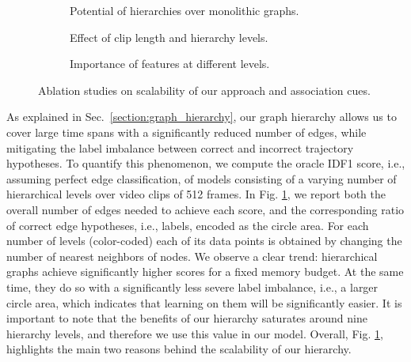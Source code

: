 \documentclass[10pt,twocolumn,letterpaper]{article}
\begin{document}
{{\begin{figure*}
     \centering
     \begin{subfigure}[b]{0.33\textwidth}
         \centering
         \caption{Potential of hierarchies over monolithic graphs.}
         \label{fig:ablation_oracle}
     \end{subfigure}
     \hfill
     \begin{subfigure}[b]{0.36\textwidth}
         \centering
         
         \caption{Effect of clip length and hierarchy levels.}
         \label{fig:ablation_hierarchy}
     \end{subfigure}
     \hfill
     \begin{subfigure}[b]{0.30\textwidth}
         \centering
         
         \caption{Importance of features at different levels.}
         \label{fig:ablation_features}
     \end{subfigure}
        \caption{Ablation studies on scalability of our approach and association cues. }
        \label{fig:three graphs}
\end{figure*}


 As explained in Sec.~\ref{section:graph_hierarchy}, our graph hierarchy allows us to cover large time spans with a significantly reduced number of edges, while mitigating the label imbalance between correct and incorrect trajectory hypotheses. To quantify this phenomenon, we compute the oracle IDF1 score, i.e., assuming perfect edge classification, of models consisting of a varying number of hierarchical levels over video clips of 512 frames. In Fig. \ref{fig:ablation_oracle}, we report both the overall number of edges needed to achieve each score, and the corresponding ratio of correct edge hypotheses, i.e., labels, encoded as the circle area. For each number of levels (color-coded) each of its data points is obtained by changing the number of nearest neighbors of nodes.
We observe a clear trend: hierarchical graphs achieve significantly higher scores for a fixed memory budget. At the same time, they do so with a significantly less severe label imbalance, i.e., a larger circle area, which indicates that learning on them will be significantly easier. It is important to note that the benefits of our hierarchy saturates around nine hierarchy levels, and therefore we use this value in our model. Overall, Fig. \ref{fig:ablation_oracle}, highlights the main two reasons behind the scalability of our hierarchy.




}}
\end{document}

